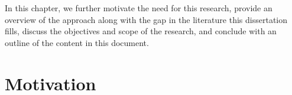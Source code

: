 \documentclass[../doc.tex]{subfiles}
\begin{document}

In this chapter, we further motivate the need for this research, provide an overview of the approach along with the gap in the literature this dissertation fills, discuss the objectives and scope of the research, and conclude with an outline of the content in this document. 

\section{Motivation}
\end{document}
